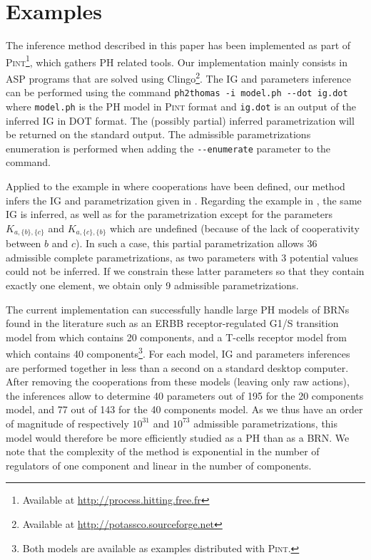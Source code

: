 \section{Examples}\label{sec:examples}

The inference method described in this paper has been implemented as part of
\textsc{Pint}\footnote{Available at \url{http://process.hitting.free.fr}}, which gathers PH related
tools.
Our implementation mainly consists in ASP programs that are solved using Clingo\footnote{Available
at \url{http://potassco.sourceforge.net}}.
The IG and parameters inference can be performed using the command
\texttt{ph2thomas -i model.ph -{}-dot ig.dot}
where \texttt{model.ph} is the PH model in \textsc{Pint} format and \texttt{ig.dot} is an output of the inferred IG in DOT format.
The (possibly partial) inferred parametrization will be returned on the standard output.
The admissible parametrizations enumeration is performed when adding the \texttt{-{}-enumerate}
parameter to the command.

Applied to the example in  where cooperations have been defined,
our method infers the IG and parametrization given in .
Regarding the example in , the same IG is inferred, as well as for the
parametrization except for the parameters $K_{a,\{b\},\{c\}}$ and $K_{a,\{c\},\{b\}}$ which are
undefined (because of the lack of cooperativity between $b$ and $c$).
In such a case, this partial parametrization allows 36 admissible complete parametrizations, as two
parameters with 3 potential values could not be inferred.
If we constrain these latter parameters so that they contain exactly one element, we obtain only 9
admissible parametrizations.

The current implementation can successfully handle large PH models of BRNs found in the literature
such as an ERBB receptor-regulated G1/S transition model from \cite{Sahin09} which contains 20
components, and a T-cells receptor model from \cite{Klamt06} which contains 40
components\footnote{Both models are available as examples distributed with \textsc{Pint}.}.
For each model, IG and parameters inferences are performed together in less than a second
on a standard desktop computer.
After removing the cooperations from these models (leaving only raw actions), the inferences allow to
determine 40 parameters out of 195 for the 20 components model, and 77 out of 143 for the 40 components model.
As we thus have an order of magnitude of respectively $10^{31}$ and $10^{73}$ admissible parametrizations,
this model would therefore be more efficiently studied as a PH than as a BRN.
We note that the complexity of the method is exponential in the number of regulators of one
component and linear in the number of components.
